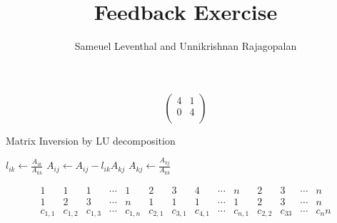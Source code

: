 \documentclass[11pt, a4paper]{article}
\title{Feedback Exercise 
}
\author{Sameuel Leventhal and Unnikrishnan Rajagopalan}
\date{}
\begin{document}
\maketitle





\iffalse

%
%
\begin{figure}[H]
\label{fig:prob1fig}
\end{figure}

%
%
\[ \begin{pmatrix}
  4 & 1 \\
  0 & 4 \\
\end{pmatrix}\]

%
%
  \begin{algorithm}[H]
\caption{Matrix Inversion by LU decomposition}
\begin{algorithmic}
              \State $l_{ik} \leftarrow \frac{A_{ik}}{A_{kk}}$ 
                        \State $A_{ij} \leftarrow A_{ij} - l_{ik}A_{kj}$ 
                    \EndFor
                    \EndIf
                    \State $A_{kj} \leftarrow \frac{A_{kj}}{A_{kk}}$ 
                    \EndFor
      \EndFor
  \EndFor
\end{algorithmic}
\end{algorithm}

%
%
  \[
  \begin{smallmatrix}
    1 & 1 & 1 & \cdots & 1 & 2 & 3 & 4 & \cdots & n & 2 & 3 & \cdots &n\\
    1 & 2 & 3 & \cdots & n & 1 & 1 & 1 & \cdots & 1 & 2 & 3 & \cdots & n\\
    c_{1,1} & c_{1,2} & c_{1,3} & \cdots & c_{1,n} & c_{2,1} & c_{3,1} & c_{4,1} & \cdots & c_{n,1} & c_{2,2} & c_33 &\cdots &c_nn\\
  \end{smallmatrix}
\]

%
%
\noindent{}
\end{document}
